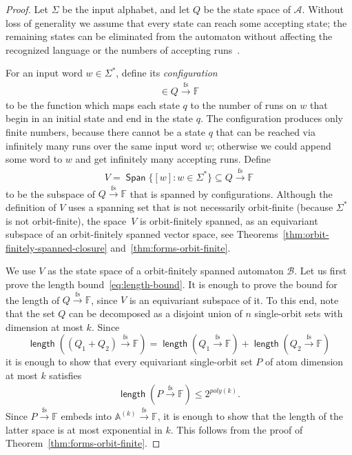 \documentclass{theoretics}
\newcommand{\set}[1]{\{#1\}}
\newcommand{\Aa}{{\mathcal A}}
\newcommand{\Bb}{{\mathcal B}}
\newcommand{\atoms}{\mathbb A}
\DeclareMathOperator{\spanvec}{\mathsf{Span}}
\DeclareMathOperator{\length}{\mathsf{length}}
\newcommand{\field}{\mathbb F}
\newcommand{\finsup}{\stackrel{\mathrm{fs}}{\to}}
\newcommand{\forms}[1]{#1 \finsup \field}
\newcommand{\formscrammed}[1]{#1 \! \finsup \! \field}
\begin{document}
\begin{proof}
    Let $\Sigma$ be the input alphabet, and let $Q$ be the state space of $\Aa$.  Without loss of generality we assume that every state can reach some accepting state; the remaining states can be eliminated from the automaton without affecting  the recognized language or the numbers of accepting runs~\cite[Cor.~9.12]{bojanczyk_slightly2018}.
    

    For an input word $w \in \Sigma^*$, define its \emph{configuration} 
    \begin{align*}
    [w] \in \forms Q
    \end{align*}
    to be the function which maps each state $q$ to the number of runs on $w$ that begin in an initial state and end in the state $q$. The configuration produces only finite numbers, because  there cannot be a  state $q$ that can be reached via infinitely many runs over the same input word $w$; otherwise we could append some word to $w$ and get infinitely many accepting runs.
    Define 
    \begin{align*}
     V = \spanvec \set{[w] : w \in \Sigma^*} \subseteq \forms Q
    \end{align*}
    to be the subspace of $\forms Q$ that is spanned by configurations. Although the definition of $V$ uses a spanning set that is not necessarily orbit-finite (because $\Sigma^*$ is not orbit-finite), the space~$V$ is orbit-finitely spanned, as an equivariant subspace of an orbit-finitely spanned vector space, see Theorems~\ref{thm:orbit-finitely-spanned-closure} and~\ref{thm:forms-orbit-finite}.  

    We use $V$ as the state space of a orbit-finitely spanned automaton $\Bb$. Let us first prove the length bound~\eqref{eq:length-bound}. It is enough to prove the bound for the length of $\forms Q$, since $V$ is an equivariant subspace of it.
  To this end, note that the set $Q$ can be decomposed as a disjoint union of $n$ single-orbit sets with dimension at most $k$. Since 
        \[
        \length( \formscrammed {(Q_1 \! + \! Q_2)}) =
        \length(\formscrammed {Q_1}) + \length(\formscrammed {Q_2})
        \]
        it is enough to show that every equivariant single-orbit set $P$ of atom dimension at most $k$ satisfies 
        \begin{align*}
        \length ( \forms P) \le 2^{poly(k)}.
        \end{align*}
        Since $\forms P$ embeds into $\forms {\atoms^{(k)}}$, it is enough to show that the length of the latter space is at most exponential in $k$.  This follows from the proof of Theorem~\ref{thm:forms-orbit-finite}.


\end{proof}
\end{document}
